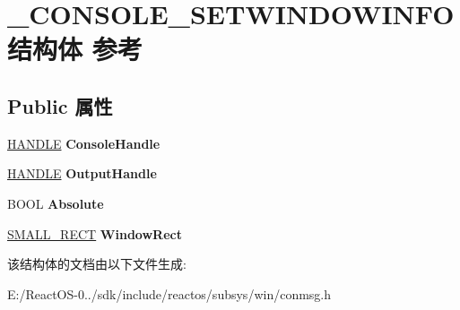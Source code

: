 \hypertarget{struct___c_o_n_s_o_l_e___s_e_t_w_i_n_d_o_w_i_n_f_o}{}\section{\+\_\+\+C\+O\+N\+S\+O\+L\+E\+\_\+\+S\+E\+T\+W\+I\+N\+D\+O\+W\+I\+N\+F\+O结构体 参考}
\label{struct___c_o_n_s_o_l_e___s_e_t_w_i_n_d_o_w_i_n_f_o}
\subsection*{Public 属性}
\begin{DoxyCompactItemize}
\item 
\mbox{\label{struct___c_o_n_s_o_l_e___s_e_t_w_i_n_d_o_w_i_n_f_o_ac7c71b7be432b91b286bcfc8a70ce955}} 
\hyperlink{interfacevoid}{H\+A\+N\+D\+LE} {\bfseries Console\+Handle}
\item 
\mbox{\label{struct___c_o_n_s_o_l_e___s_e_t_w_i_n_d_o_w_i_n_f_o_af26ab05dab317cb7f8027359cc586c14}} 
\hyperlink{interfacevoid}{H\+A\+N\+D\+LE} {\bfseries Output\+Handle}
\item 
\mbox{\label{struct___c_o_n_s_o_l_e___s_e_t_w_i_n_d_o_w_i_n_f_o_a0212d4603aad1c16574c7a7754bcc2ee}} 
B\+O\+OL {\bfseries Absolute}
\item 
\mbox{\label{struct___c_o_n_s_o_l_e___s_e_t_w_i_n_d_o_w_i_n_f_o_a804b73bab2e97e073cf129de735a949b}} 
\hyperlink{structtag_s_m_a_l_l___r_e_c_t}{S\+M\+A\+L\+L\+\_\+\+R\+E\+CT} {\bfseries Window\+Rect}
\end{DoxyCompactItemize}


该结构体的文档由以下文件生成\+:\begin{DoxyCompactItemize}
\item 
E\+:/\+React\+O\+S-\/0../sdk/include/reactos/subsys/win/conmsg.\+h\end{DoxyCompactItemize}
